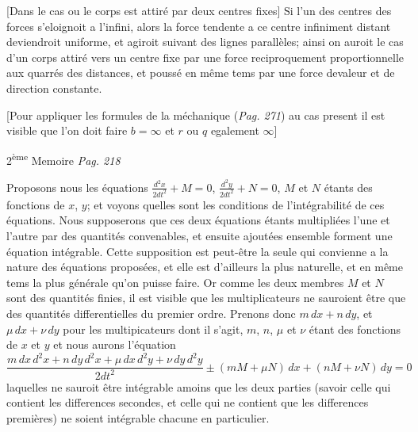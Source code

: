 \documentclass[11pt,a4paper]{article}
\begin{document}
[Dans le cas ou le corps est attiré par deux centres fixes]
Si l'un des centres des forces s'eloignoit a l'infini, alors la force
tendente a ce centre infiniment distant deviendroit uniforme, et
agiroit suivant des lignes parallèles; ainsi on auroit le cas d'un
corps attiré vers un centre fixe par une force reciproquement
proportionnelle aux quarrés des distances, et poussé en même
tems par une force devaleur et de direction constante.

[Pour appliquer les formules de la méchanique (\emph{Pag. 271}) au cas present
il est visible que l'on doit faire $b = \infty$ et $r$ ou $q$ egalement $\infty$]

2\textsuperscript{ème} Memoire \emph{Pag. 218}

Proposons nous les équations $\frac{d^{2}x}{2dt^{2}} + M = 0$, \quad $\frac{d^{2}y}{2dt^{2}} + N = 0$, $M$ et $N$ étants
des fonctions de $x$, $y$; et voyons quelles sont les conditions de l'intégrabilité
de ces équations.
Nous supposerons que ces deux équations étants multipliées
l'une et l'autre par des quantités convenables, et ensuite ajoutées
ensemble forment une équation intégrable. Cette supposition est
peut-être la seule qui convienne a la nature des équations proposées,
et elle est d'ailleurs la plus naturelle, et en même tems la plus
générale qu'on puisse faire. Or comme les deux membres $M$ et
$N$ sont des quantités finies, il est visible que les multiplicateurs
ne sauroient être que des quantités differentielles du premier ordre.
Prenons donc $m\,dx + n\,dy$, et $\mu\,dx + \nu\,dy$ pour les multipicateurs dont il
s'agit, $m$, $n$, $\mu$ et $\nu$ étant des fonctions de $x$ et $y$ et nous aurons l'équation
\[ \frac{m\,dx\,d^{2}x + n\,dy\,d^{2}x + \mu\,dx\,d^{2}y + \nu\,dy\,d^{2}y}{2dt^{2}} \pm (mM + \mu N)\,dx + (nM + \nu N)\,dy = 0 \]
laquelles ne sauroit être intégrable amoins que les deux parties (savoir
celle qui contient les differences secondes, et celle qui ne contient que
les differences premières) ne soient intégrable chacune en particulier.
\end{document}
